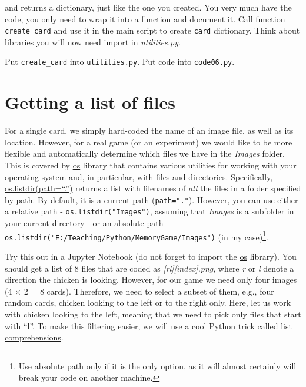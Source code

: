 \documentclass[
]{book}
\begin{document}
and returns a dictionary, just like the one you created. You very much have the code, you only need to wrap it into a function and document it. Call function \texttt{create\_card} and use it in the main script to create \texttt{card} dictionary. Think about libraries you will now need import in \emph{utilities.py}.

Put \texttt{create\_card} into \texttt{utilities.py}.
Put code into \texttt{code06.py}.

\hypertarget{getting-a-list-of-files}{%
\section{Getting a list of files}\label{getting-a-list-of-files}}

For a single card, we simply hard-coded the name of an image file, as well as its location. However, for a real game (or an experiment) we would like to be more flexible and automatically determine which files we have in the \emph{Images} folder. This is covered by \href{https://docs.python.org/3/library/os.html}{os} library that contains various utilities for working with your operating system and, in particular, with files and directories. Specifically, \href{https://docs.python.org/3/library/os.html\#os.listdir}{os.listdir(path=``.'')} returns a list with filenames of \emph{all} the files in a folder specified by path. By default, it is a current path (\texttt{path="."}). However, you can use either a relative path - \texttt{os.listdir("Images")}, assuming that \emph{Images} is a subfolder in your current directory - or an absolute path \texttt{os.listdir("E:/Teaching/Python/MemoryGame/Images")} (in my case)\footnote{Use absolute path only if it is the only option, as it will almost certainly will break your code on another machine.}.

Try this out in a Jupyter Notebook (do not forget to import the \href{https://docs.python.org/3/library/os.html\#module-os}{os} library). You should get a list of 8 files that are coded as \emph{{[}r\textbar l{]}{[}index{]}.png}, where \emph{r} or \emph{l} denote a direction the chicken is looking. However, for our game we need only four images (4 × 2 = 8 cards). Therefore, we need to select a subset of them, e.g., four random cards, chicken looking to the left or to the right only. Here, let us work with chicken looking to the left, meaning that we need to pick only files that start with ``l''. To make this filtering easier, we will use a cool Python trick called \href{https://docs.python.org/3/tutorial/datastructures.html\#list-comprehensions}{list comprehensions}.
\end{document}
